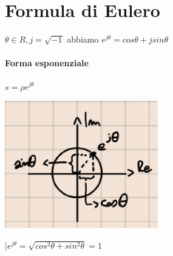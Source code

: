 \documentclass[a4paper, 12pt]{book}
\theoremstyle{plain}
\begin{document}
\section{Formula di Eulero}

$\theta \in R, j = \sqrt{-1}$ abbiamo $e^{j\theta}=cos\theta +jsin\theta$

\paragraph{Forma esponenziale}

$s=\rho e^{j\theta}$
\begin{center}
    \includegraphics[width=0.5\textwidth]{num_comp2.png}
\end{center}
$|e^{j\theta}=\sqrt{cos^2\theta +sin^2\theta} = 1$
\end{document}
